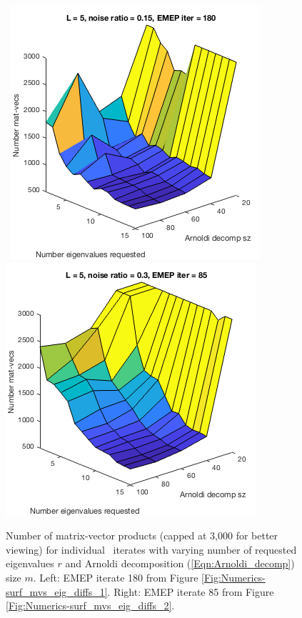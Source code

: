 \begin{figure}[H]
\centering
\hbox{\hspace{-0.1cm} 
	\includegraphics[scale=0.6]{Numerics-surf_mvs_for_m_vs_j_1}
	\includegraphics[scale=0.6]{Numerics-surf_mvs_for_m_vs_j_2} 
			}
	\vspace{0.0cm}
	\caption{
Number of matrix-vector products (capped at 3,000 for better viewing) for individual \emep \ iterates with varying number of requested eigenvalues $r$ and Arnoldi decomposition (\ref{Eqn:Arnoldi_decomp}) size $m$.  
Left: EMEP iterate 180 from Figure \ref{Fig:Numerics-surf_mvs_eig_diffs_1}.
Right: EMEP iterate 85 from Figure \ref{Fig:Numerics-surf_mvs_eig_diffs_2}.
	}
\label{Fig:Numerics-surf_mvs_for_m_vs_j}
\end{figure}




